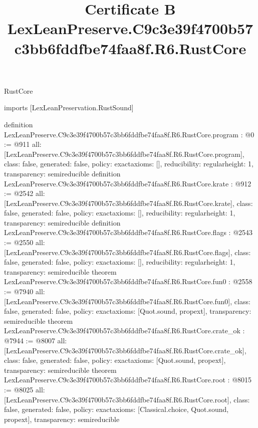 \begin{lexlean}{RustCore}
\title{Certificate B LexLeanPreserve.C9c3e39f4700b57c3bb6fddfbe74faa8f.R6.RustCore}
\begin{coremodule}
imports [LexLeanPreservation.RustSound]

definition LexLeanPreserve.C9c3e39f4700b57c3bb6fddfbe74faa8f.R6.RustCore.program : @0 := @911 {
  all: [LexLeanPreserve.C9c3e39f4700b57c3bb6fddfbe74faa8f.R6.RustCore.program],
  class: false,
  generated: false,
  policy: exact{axioms: []},
  reducibility: regular{height: 1},
  transparency: semireducible
}
definition LexLeanPreserve.C9c3e39f4700b57c3bb6fddfbe74faa8f.R6.RustCore.krate : @912 := @2542 {
  all: [LexLeanPreserve.C9c3e39f4700b57c3bb6fddfbe74faa8f.R6.RustCore.krate],
  class: false,
  generated: false,
  policy: exact{axioms: []},
  reducibility: regular{height: 1},
  transparency: semireducible
}
definition LexLeanPreserve.C9c3e39f4700b57c3bb6fddfbe74faa8f.R6.RustCore.flags : @2543 := @2550 {
  all: [LexLeanPreserve.C9c3e39f4700b57c3bb6fddfbe74faa8f.R6.RustCore.flags],
  class: false,
  generated: false,
  policy: exact{axioms: []},
  reducibility: regular{height: 1},
  transparency: semireducible
}
theorem LexLeanPreserve.C9c3e39f4700b57c3bb6fddfbe74faa8f.R6.RustCore.fun0 : @2558 := @7940 {
  all: [LexLeanPreserve.C9c3e39f4700b57c3bb6fddfbe74faa8f.R6.RustCore.fun0],
  class: false,
  generated: false,
  policy: exact{axioms: [Quot.sound, propext]},
  transparency: semireducible
}
theorem LexLeanPreserve.C9c3e39f4700b57c3bb6fddfbe74faa8f.R6.RustCore.crate_ok : @7944 := @8007 {
  all: [LexLeanPreserve.C9c3e39f4700b57c3bb6fddfbe74faa8f.R6.RustCore.crate_ok],
  class: false,
  generated: false,
  policy: exact{axioms: [Quot.sound, propext]},
  transparency: semireducible
}
theorem LexLeanPreserve.C9c3e39f4700b57c3bb6fddfbe74faa8f.R6.RustCore.root : @8015 := @8025 {
  all: [LexLeanPreserve.C9c3e39f4700b57c3bb6fddfbe74faa8f.R6.RustCore.root],
  class: false,
  generated: false,
  policy: exact{axioms: [Classical.choice, Quot.sound, propext]},
  transparency: semireducible
}


\end{coremodule}
\end{lexlean}

